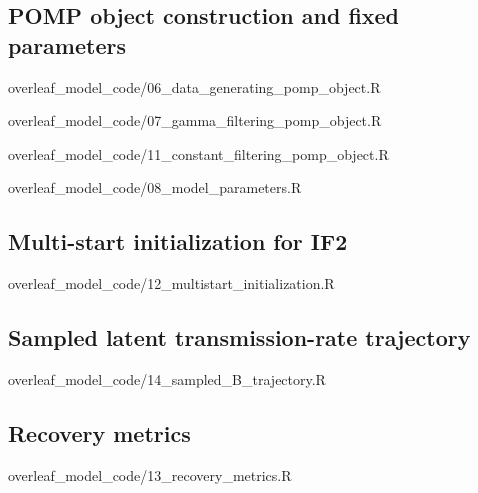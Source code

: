 \subsection{POMP object construction and fixed parameters}

{overleaf_model_code/06_data_generating_pomp_object.R}

{overleaf_model_code/07_gamma_filtering_pomp_object.R}

{overleaf_model_code/11_constant_filtering_pomp_object.R}

{overleaf_model_code/08_model_parameters.R}

\subsection{Multi-start initialization for IF2}

{overleaf_model_code/12_multistart_initialization.R}

\subsection{Sampled latent transmission-rate trajectory}

{overleaf_model_code/14_sampled_B_trajectory.R}

\subsection{Recovery metrics}

{overleaf_model_code/13_recovery_metrics.R}
